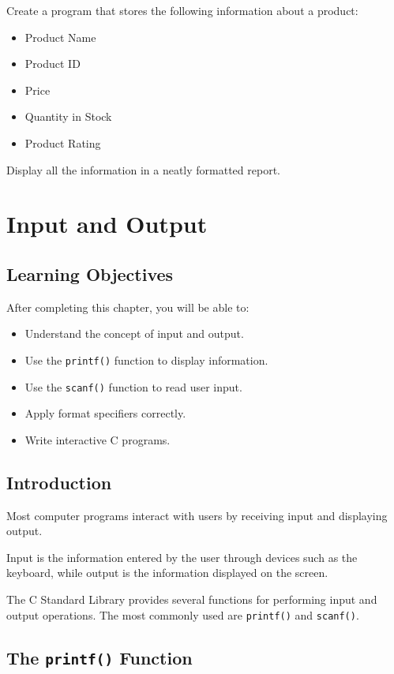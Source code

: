 \documentclass[12pt,openany]{book}
\begin{document}
Create a program that stores the following information about a product:

\begin{itemize}
    \item Product Name
    \item Product ID
    \item Price
    \item Quantity in Stock
    \item Product Rating
\end{itemize}

Display all the information in a neatly formatted report.
\chapter{Input and Output}

\section{Learning Objectives}

After completing this chapter, you will be able to:

\begin{itemize}
    \item Understand the concept of input and output.
    \item Use the \texttt{printf()} function to display information.
    \item Use the \texttt{scanf()} function to read user input.
    \item Apply format specifiers correctly.
    \item Write interactive C programs.
\end{itemize}

\section{Introduction}

Most computer programs interact with users by receiving input and displaying output.

Input is the information entered by the user through devices such as the keyboard, while output is the information displayed on the screen.

The C Standard Library provides several functions for performing input and output operations. The most commonly used are \texttt{printf()} and \texttt{scanf()}.

\section{The \texttt{printf()} Function}
\end{document}

